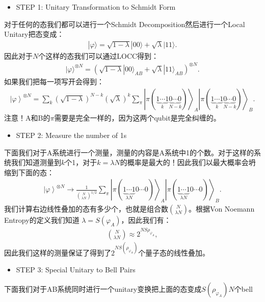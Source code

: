 \begin{itemize}
  \item STEP 1: Unitary Transformation to Schmidt Form
\end{itemize}
对于任何的态我们都可以进行一个Schmidt Decomposition然后进行一个Local Unitary把态变成：
\begin{align}
  |\varphi\rangle=\sqrt{1-\lambda}|00\rangle+\sqrt{\lambda}|11\rangle.
\end{align}
因此对于$ N $个这样的态我们可以通过LOCC得到：
\begin{align}
  |\varphi\rangle^{\otimes
  N}=\left(\sqrt{1-\lambda}|00\rangle_{AB}+\sqrt{\lambda}|11\rangle_{AB}\right)^{\otimes
  N}.
\end{align}
如果我们把每一项写开会得到：
\begin{align}\label{eq:lec11-1}
  \left|\varphi\right\rangle^{\otimes
  N}=\sum_{k}\left(\sqrt{1-\lambda}\right)^{N-k}\left(\sqrt{\lambda}\right)^{k}\sum_{\pi}\left|\pi\left(\underbrace{1\cdots1}_{k}\underbrace{0\cdots0}_{N-k}\right)\right\rangle_{A}\left|\pi\left(\underbrace{1\cdots1}_{k}\underbrace{0\cdots0}_{N-k}\right)\right\rangle_{B}.
\end{align}
注意！A和B的$ \pi $需要是完全一样的，因为这两个qubit是完全纠缠的。
\begin{itemize}
  \item STEP 2: Measure the number of 1s
\end{itemize}
下面我们对于A系统进行一个测量，测量的内容是A系统中1的个数。对于这样的系统我们知道测量到$ k $个1，对于$ k = \lambda
N $的概率是最大的！因此我们以最大概率会坍缩到下面的态：
\begin{align}
  \left|\varphi\right\rangle^{\otimes N}\to\frac{1}{\binom{N}{\lambda
  N}^{1/2}}\sum_\pi\left|\pi\left(\underbrace{1\cdots1}_{\lambda
  N}0\cdots0\right)\right\rangle_A\left|\pi\left(\underbrace{1\cdots1}_{\lambda
  N}0\cdots0\right)\right\rangle_B.
\end{align}
我们计算右边线性叠加的态有多少个，也就是组合数$ \binom{N}{\lambda N} $。根据Von Noemann
Entropy的定义我们知道 $ \lambda=S(\varphi_A) $，因此我们有：
\begin{align}
  \binom{N}{\lambda N}\approx2^{N S{\rho_{\varphi_A}}},
\end{align}
因此我们这样的测量保证了得到了$ 2^{N S(\rho_{\varphi_A})} $个量子态的线性叠加。
\begin{itemize}
  \item STEP 3: Special Unitary to Bell Pairs
\end{itemize}
下面我们对于AB系统同时进行一个unitary变换把上面的态变成$ S(\rho_{\varphi_A})N $个bell
